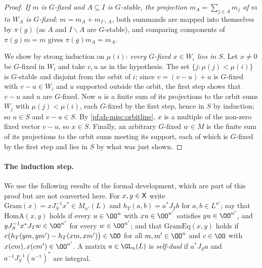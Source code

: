 \begin{proof}
\emph{If $m$ is $G$-fixed and $A\subseteq I$ is $G$-stable, the projection $m_A=\sum_{j\in A}m_j$ of $m$ to $W_A$ is $G$-fixed}: $m=m_A+m_{I\smallsetminus A}$,
both summands are mapped into themselves by $\pi(g)$ (as $A$ and $I\smallsetminus A$ are $G$-stable), and comparing components of
$\pi(g)m=m$ gives $\pi(g)m_A=m_A$.

We show by strong induction on $\mu(i)$: \emph{every $G$-fixed $x\in W_i$ lies in $S$.} Let $x\ne0$ be $G$-fixed in $W_i$ and take $v,u$ as
in the hypothesis. The set $\{j:\mu(j)<\mu(i)\}$ is $G$-stable and disjoint from the orbit of $i$; since $v=(v-u)+u$ is $G$-fixed with
$v-u\in W_i$ and $u$ supported outside the orbit, the first step shows that $v-u$ and $u$ are $G$-fixed. Now $u$ is a finite sum of its
projections to the orbit sums $W_j$ with $\mu(j)<\mu(i)$, each $G$-fixed by the first step, hence in $S$ by induction; so $u\in S$ and
$v-u\in S$. By \cref{pf:sh-misc:orbitline}, $x$ is a multiple of the non-zero fixed vector $v-u$, so $x\in S$. Finally, an arbitrary $G$-fixed
$w\in M$ is the finite sum of its projections to the orbit sums meeting its support, each of which is $G$-fixed by the first step and lies in
$S$ by what was just shown.
\end{proof}

\paragraph{The induction step.}
We use the following results of the formal development, which are part of this proof but are not converted here.
For $x,y\in\mathsf X$ write $\mathrm{Gram}(x)=xJ_S^{-1}x^*\in M_{n'}(L)$ and $h_T(a,b)=a^*J_Tb$ for $a,b\in L^{n'}$; say that
$\mathrm{HomA}(x,y)$ holds if every $u\in\OO^n$ with $xu\in\OO^{n'}$ satisfies $yu\in\OO^{n'}$, and $yJ_S^{-1}x^*J_Tw\in\OO^{n'}$ for every
$w\in\OO^{n'}$; and that $\mathrm{GramEq}(x,y)$ holds if $c\bigl(h_T(ym,ym')-h_T(xm,xm')\bigr)\in\OO$ for all $m,m'\in\OO^n$ and $c\in\OO$ with
$x(cm),x(cm')\in\OO^{n'}$. A matrix $a\in\GL_n(L)$ is \emph{self-dual} if $a^*J_Sa$ and $a^{-1}J_S^{-1}(a^{-1})^*$ are integral.

